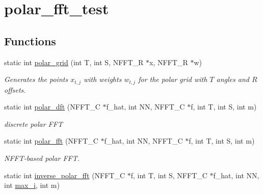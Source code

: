 \hypertarget{group__applications__polarFFT__polar}{\section{polar\-\_\-fft\-\_\-test}
\label{group__applications__polarFFT__polar}
}
\subsection*{Functions}
\begin{DoxyCompactItemize}
\item 
static int \hyperlink{group__applications__polarFFT__polar_ga39e0090863b1c4213a9d21f4a19c3418}{polar\-\_\-grid} (int T, int S, N\-F\-F\-T\-\_\-\-R $\ast$x, N\-F\-F\-T\-\_\-\-R $\ast$w)
\begin{DoxyCompactList}\small\item\em Generates the points $x_{t,j}$ with weights $w_{t,j}$ for the polar grid with $T$ angles and $R$ offsets. \end{DoxyCompactList}\item 
\hypertarget{group__applications__polarFFT__polar_ga184bf7ebf72e4716eaabdc2817cd6c77}{static int \hyperlink{group__applications__polarFFT__polar_ga184bf7ebf72e4716eaabdc2817cd6c77}{polar\-\_\-dft} (N\-F\-F\-T\-\_\-\-C $\ast$f\-\_\-hat, int N\-N, N\-F\-F\-T\-\_\-\-C $\ast$f, int T, int S, int m)}\label{group__applications__polarFFT__polar_ga184bf7ebf72e4716eaabdc2817cd6c77}

\begin{DoxyCompactList}\small\item\em discrete polar F\-F\-T \end{DoxyCompactList}\item 
\hypertarget{group__applications__polarFFT__polar_ga283f1b649bf35ef656cfcd1d6dd257cd}{static int \hyperlink{group__applications__polarFFT__polar_ga283f1b649bf35ef656cfcd1d6dd257cd}{polar\-\_\-fft} (N\-F\-F\-T\-\_\-\-C $\ast$f\-\_\-hat, int N\-N, N\-F\-F\-T\-\_\-\-C $\ast$f, int T, int S, int m)}\label{group__applications__polarFFT__polar_ga283f1b649bf35ef656cfcd1d6dd257cd}

\begin{DoxyCompactList}\small\item\em N\-F\-F\-T-\/based polar F\-F\-T. \end{DoxyCompactList}\item 
\hypertarget{group__applications__polarFFT__polar_gaa3f736467a4ceb523b105c683f382d1f}{static int \hyperlink{group__applications__polarFFT__polar_gaa3f736467a4ceb523b105c683f382d1f}{inverse\-\_\-polar\-\_\-fft} (N\-F\-F\-T\-\_\-\-C $\ast$f, int T, int S, N\-F\-F\-T\-\_\-\-C $\ast$f\-\_\-hat, int N\-N, int \hyperlink{group__applications__fastsum_ga6bc571f685f894e15b83a848a0a30faa}{max\-\_\-i}, int m)}\label{group__applications__polarFFT__polar_gaa3f736467a4ceb523b105c683f382d1f}


\end{DoxyCompactItemize}
